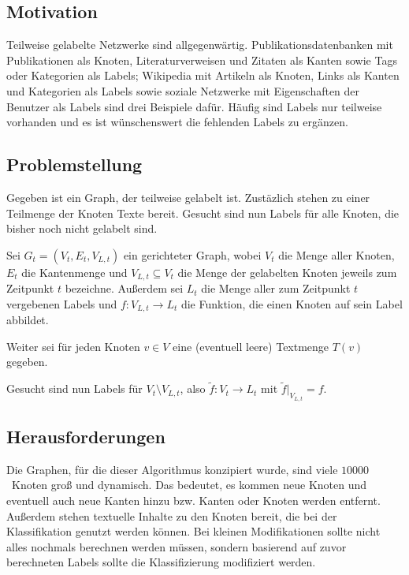 \subsection{Motivation}
Teilweise gelabelte Netzwerke sind allgegenwärtig. Publikationsdatenbanken
mit Publikationen als Knoten, Literaturverweisen und Zitaten als Kanten
sowie Tags oder Kategorien als Labels;
Wikipedia mit Artikeln als Knoten, Links als Kanten und Kategorien
als Labels sowie soziale Netzwerke mit Eigenschaften der Benutzer
als Labels sind drei Beispiele dafür.
Häufig sind Labels nur teilweise vorhanden und es ist wünschenswert die 
fehlenden Labels zu ergänzen. 

\subsection{Problemstellung}
Gegeben ist ein Graph, der teilweise gelabelt ist. Zustäzlich stehen
zu einer Teilmenge der Knoten Texte bereit. Gesucht sind nun Labels
für alle Knoten, die bisher noch nicht gelabelt sind.\\

\begin{definition}[Knotenklassifierungsproblem]\label{def:Knotenklassifizierungsproblem}
    Sei $G_t = (V_t, E_t, V_{L,t})$ ein gerichteter Graph,
    wobei $V_t$ die Menge aller Knoten,
    $E_t$ die Kantenmenge und $V_{L,t} \subseteq V_t$ die Menge der 
    gelabelten Knoten jeweils zum Zeitpunkt $t$ bezeichne.
    Außerdem sei $L_t$ die Menge aller zum Zeitpunkt $t$ vergebenen
    Labels und $f:V_{L,t} \rightarrow L_t$ die Funktion, die einen
    Knoten auf sein Label abbildet.

    Weiter sei für jeden Knoten $v \in V$ eine (eventuell leere)
    Textmenge $T(v)$ gegeben.

    Gesucht sind nun Labels für $V_t \setminus V_{L,t}$, also
    $\tilde{f}: V_t \rightarrow L_t$ mit 
    $\tilde{f}|_{V_{L,t}} = f$.
\end{definition}

\subsection{Herausforderungen}
Die Graphen, für die dieser Algorithmus konzipiert wurde,
sind viele $\num{10000}$~Knoten groß und dynamisch. Das bedeutet, es 
kommen neue Knoten und eventuell auch neue Kanten hinzu bzw. Kanten 
oder Knoten werden entfernt. Außerdem stehen textuelle Inhalte zu den 
Knoten bereit, die bei der Klassifikation genutzt werden können.
Bei kleinen Modifikationen sollte nicht alles nochmals berechnen 
werden müssen, sondern basierend auf zuvor
berechneten Labels sollte die Klassifizierung modifiziert werden.
